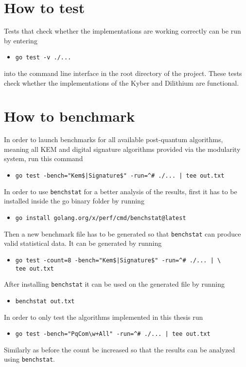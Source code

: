 \section{How to test}
Tests that check whether the implementations are working correctly can be run by entering
\begin{itemize}
  \item \texttt{go test -v ./...}
\end{itemize}
into the command line interface in the root directory of the project. These tests check whether the implementations of the Kyber and Dilithium are functional.

\section{How to benchmark}
\label{sec:how_to_bench}
In order to launch benchmarks for all available post-quantum algorithms, meaning all KEM and digital signature algorithms provided via the modularity system, run this command
\begin{itemize}
  \item \texttt{go test -bench="Kem\$|Signature\$" -run=\^{}\# ./... | tee out.txt}
\end{itemize}
In order to use \texttt{benchstat} for a better analysis of the results, first it has to be installed inside the go binary folder by running
\begin{itemize}
  \item \texttt{go install golang.org/x/perf/cmd/benchstat@latest}
\end{itemize}
Then a new benchmark file has to be generated so that \texttt{benchstat} can produce valid statistical data. It can be generated by running
\begin{itemize}
  \item \texttt{go test -count=8 -bench="Kem\$|Signature\$" -run=\^{}\# ./... | \textbackslash\\tee out.txt}
\end{itemize}
After installing \texttt{benchstat} it can be used on the generated file by running
\begin{itemize}
  \item \texttt{benchstat out.txt}
\end{itemize}
In order to only test the algorithms implemented in this thesis run
\begin{itemize}
  \item \texttt{go test -bench="PqCom\textbackslash w+All" -run=\^{}\# ./... | tee out.txt}
\end{itemize}
Similarly as before the count be increased so that the results can be analyzed using \texttt{benchstat}.
